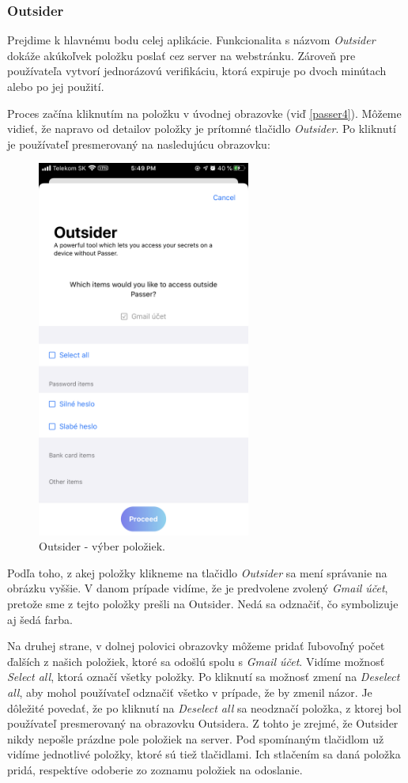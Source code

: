 \subsubsection{Outsider}
Prejdime k hlavnému bodu celej aplikácie. Funkcionalita s názvom \textit{Outsider} dokáže akúkoľvek položku poslať cez server na webstránku. Zároveň pre používateľa vytvorí jednorázovú verifikáciu, ktorá expiruje po dvoch minútach alebo po jej použití. 

Proces začína kliknutím na položku v úvodnej obrazovke (viď \figurename{ \ref{passer4}}). Môžeme vidieť, že napravo od detailov položky je prítomné tlačidlo \textit{Outsider}. Po kliknutí je používateľ presmerovaný na nasledujúcu obrazovku:

\begin{figure}[H]
  \centering
  \includegraphics[width=7cm]{img/passer6.PNG}
  \caption{Outsider - výber položiek.}
  \label{passer6}
\end{figure}

Podľa toho, z akej položky klikneme na tlačidlo \textit{Outsider} sa mení správanie na obrázku vyššie. V danom prípade vidíme, že je predvolene zvolený \textit{Gmail účet}, pretože sme z tejto položky prešli na Outsider. Nedá sa odznačiť, čo symbolizuje aj šedá farba. 

Na druhej strane, v dolnej polovici obrazovky môžeme pridať ľubovoľný počet ďalších z našich položiek, ktoré sa odošlú spolu s \textit{Gmail účet}. Vidíme možnosť \textit{Select all}, ktorá označí všetky položky. Po kliknutí sa možnosť zmení na \textit{Deselect all}, aby mohol používateľ odznačiť všetko v prípade, že by zmenil názor. Je dôležité povedať, že po kliknutí na \textit{Deselect all} sa neodznačí položka, z ktorej bol používateľ presmerovaný na obrazovku Outsidera. Z tohto je zrejmé, že Outsider nikdy nepošle prázdne pole položiek na server. Pod spomínaným tlačidlom už vidíme jednotlivé položky, ktoré sú tiež tlačidlami. Ich stlačením sa daná položka pridá, respektíve odoberie zo zoznamu položiek na odoslanie.

